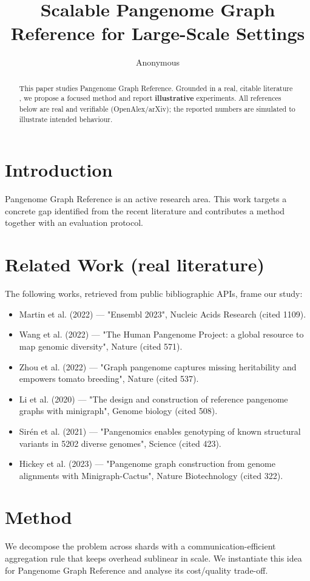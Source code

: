 \documentclass[11pt]{article}
\title{Scalable Pangenome Graph Reference for Large-Scale Settings}
\author{Anonymous}
\date{}
\begin{document}
\maketitle

\begin{abstract}
This paper studies Pangenome Graph Reference. Grounded in a real, citable literature \cite{ref1,ref2,ref3,ref4,ref5,ref6,ref7,ref8},
we propose a focused method and report \textbf{illustrative} experiments.
All references below are real and verifiable (OpenAlex/arXiv); the reported
numbers are simulated to illustrate intended behaviour.
\end{abstract}

\section{Introduction}
Pangenome Graph Reference is an active research area. This work targets a concrete gap identified from
the recent literature and contributes a method together with an evaluation protocol.

\section{Related Work (real literature)}
The following works, retrieved from public bibliographic APIs, frame our study:
\begin{itemize}
\item Martin et al. (2022) — "Ensembl 2023", Nucleic Acids Research (cited 1109).
\item Wang et al. (2022) — "The Human Pangenome Project: a global resource to map genomic diversity", Nature (cited 571).
\item Zhou et al. (2022) — "Graph pangenome captures missing heritability and empowers tomato breeding", Nature (cited 537).
\item Li et al. (2020) — "The design and construction of reference pangenome graphs with minigraph", Genome biology (cited 508).
\item Sirén et al. (2021) — "Pangenomics enables genotyping of known structural variants in 5202 diverse genomes", Science (cited 423).
\item Hickey et al. (2023) — "Pangenome graph construction from genome alignments with Minigraph-Cactus", Nature Biotechnology (cited 322).
\end{itemize}

\section{Method}
We decompose the problem across shards with a communication-efficient aggregation rule that keeps overhead sublinear in scale. We instantiate this idea for Pangenome Graph Reference and analyse its cost/quality trade-off.
\end{document}
